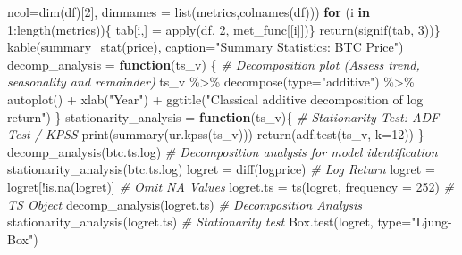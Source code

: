 \documentclass[
  11pt,
]{article}
\newenvironment{Shaded}{\begin{snugshade}}{\end{snugshade}}
\newcommand{\AttributeTok}[1]{\textcolor[rgb]{0.77,0.63,0.00}{#1}}
\newcommand{\CommentTok}[1]{\textcolor[rgb]{0.56,0.35,0.01}{\textit{#1}}}
\newcommand{\ControlFlowTok}[1]{\textcolor[rgb]{0.13,0.29,0.53}{\textbf{#1}}}
\newcommand{\DecValTok}[1]{\textcolor[rgb]{0.00,0.00,0.81}{#1}}
\newcommand{\FunctionTok}[1]{\textcolor[rgb]{0.00,0.00,0.00}{#1}}
\newcommand{\NormalTok}[1]{#1}
\newcommand{\OtherTok}[1]{\textcolor[rgb]{0.56,0.35,0.01}{#1}}
\newcommand{\SpecialCharTok}[1]{\textcolor[rgb]{0.00,0.00,0.00}{#1}}
\newcommand{\StringTok}[1]{\textcolor[rgb]{0.31,0.60,0.02}{#1}}
\begin{document}
\begin{Shaded}
\begin{Highlighting}[]
               \AttributeTok{ncol=}\FunctionTok{dim}\NormalTok{(df)[}\DecValTok{2}\NormalTok{], }
               \AttributeTok{dimnames =} \FunctionTok{list}\NormalTok{(metrics,}\FunctionTok{colnames}\NormalTok{(df)))}
  \ControlFlowTok{for}\NormalTok{ (i }\ControlFlowTok{in} \DecValTok{1}\SpecialCharTok{:}\FunctionTok{length}\NormalTok{(metrics))\{}
\NormalTok{    tab[i,] }\OtherTok{=} \FunctionTok{apply}\NormalTok{(df, }\DecValTok{2}\NormalTok{, met\_func[[i]])\}}
  \FunctionTok{return}\NormalTok{(}\FunctionTok{signif}\NormalTok{(tab, }\DecValTok{3}\NormalTok{))\}}
\FunctionTok{kable}\NormalTok{(}\FunctionTok{summary\_stat}\NormalTok{(price), }\AttributeTok{caption=}\StringTok{"Summary Statistics: BTC Price"}\NormalTok{)}
\NormalTok{decomp\_analysis }\OtherTok{=} \ControlFlowTok{function}\NormalTok{(ts\_v) \{}
  \CommentTok{\#\textquotesingle{} Decomposition plot (Assess trend, seasonality and remainder)}
\NormalTok{  ts\_v }\SpecialCharTok{\%\textgreater{}\%} \FunctionTok{decompose}\NormalTok{(}\AttributeTok{type=}\StringTok{"additive"}\NormalTok{) }\SpecialCharTok{\%\textgreater{}\%}
  \FunctionTok{autoplot}\NormalTok{() }\SpecialCharTok{+} \FunctionTok{xlab}\NormalTok{(}\StringTok{"Year"}\NormalTok{) }\SpecialCharTok{+}
  \FunctionTok{ggtitle}\NormalTok{(}\StringTok{"Classical additive decomposition of log return"}\NormalTok{)}
\NormalTok{\}}
\NormalTok{stationarity\_analysis }\OtherTok{=} \ControlFlowTok{function}\NormalTok{(ts\_v)\{}
  \CommentTok{\#\textquotesingle{} Stationarity Test: ADF Test / KPSS}
  \FunctionTok{print}\NormalTok{(}\FunctionTok{summary}\NormalTok{(}\FunctionTok{ur.kpss}\NormalTok{(ts\_v)))}
  \FunctionTok{return}\NormalTok{(}\FunctionTok{adf.test}\NormalTok{(ts\_v, }\AttributeTok{k=}\DecValTok{12}\NormalTok{))}
\NormalTok{\}}
\FunctionTok{decomp\_analysis}\NormalTok{(btc.ts.log) }\CommentTok{\# Decomposition analysis for model identification}
\FunctionTok{stationarity\_analysis}\NormalTok{(btc.ts.log)}
\NormalTok{logret }\OtherTok{=} \FunctionTok{diff}\NormalTok{(logprice) }\CommentTok{\# Log Return}
\NormalTok{logret }\OtherTok{=}\NormalTok{ logret[}\SpecialCharTok{!}\FunctionTok{is.na}\NormalTok{(logret)] }\CommentTok{\# Omit NA Values}
\NormalTok{logret.ts }\OtherTok{=} \FunctionTok{ts}\NormalTok{(logret, }\AttributeTok{frequency =} \DecValTok{252}\NormalTok{) }\CommentTok{\# TS Object}
\FunctionTok{decomp\_analysis}\NormalTok{(logret.ts) }\CommentTok{\# Decomposition Analysis}
\FunctionTok{stationarity\_analysis}\NormalTok{(logret.ts) }\CommentTok{\# Stationarity test}
\FunctionTok{Box.test}\NormalTok{(logret, }\AttributeTok{type=}\StringTok{"Ljung{-}Box"}\NormalTok{)}

\end{Highlighting}
\end{Shaded}
\end{document}

